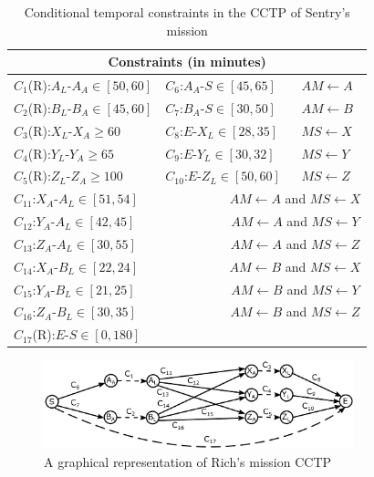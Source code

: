 \documentclass[jair,twoside,11pt,theapa]{article}
\begin{document}
\begin{table}[h!]	
	\centering
	\begin{tabular}{| m{5.0cm} m{4.0cm} m{5.0cm} m{4.0cm} m{2.0cm}|}
		\hline
		\multicolumn{5}{|c|}{\textbf{Constraints (in minutes)}} \\
		\hline		
		\multicolumn{2}{|l}{$C_1$(R):$A_L$-$A_A\in[50,60]$} &
		\multicolumn{2}{l}{$C_6$:$A_A$-$S\in[45,65]$} & $AM \leftarrow A$ \\ 
		\multicolumn{2}{|l}{$C_2$(R):$B_L$-$B_A\in[45,60]$} &
		\multicolumn{2}{l}{$C_7$:$B_A$-$S\in[30,50]$} & $AM \leftarrow B$ \\ 
		\multicolumn{2}{|l}{$C_3$(R):$X_L$-$X_A\geq60$} &
		\multicolumn{2}{l}{$C_8$:$E$-$X_L\in[28,35]$} & $MS \leftarrow X$ \\ 
		\multicolumn{2}{|l}{$C_4$(R):$Y_L$-$Y_A\geq65$} &
		\multicolumn{2}{l}{$C_9$:$E$-$Y_L\in[30,32]$} & $MS \leftarrow Y$ \\ 
		\multicolumn{2}{|l}{$C_5$(R):$Z_L$-$Z_A\geq100$} &
		\multicolumn{2}{l}{$C_{10}$:$E$-$Z_L\in[50,60]$} & $MS \leftarrow Z$ \\ 
		\hline
		\multicolumn{3}{|l}{$C_{11}$:$X_A$-$A_L\in[51,54]$} & \multicolumn{2}{c|}{$AM
			\leftarrow A$ and $MS \leftarrow X$} \\ 
		\multicolumn{3}{|l}{$C_{12}$:$Y_A$-$A_L\in[42,45]$} & \multicolumn{2}{c|}{$AM
			\leftarrow A$ and $MS \leftarrow Y$} \\ 
		\multicolumn{3}{|l}{$C_{13}$:$Z_A$-$A_L\in[30,55]$} & \multicolumn{2}{c|}{$AM
			\leftarrow A$ and $MS \leftarrow Z$} \\ 
		\multicolumn{3}{|l}{$C_{14}$:$X_A$-$B_L\in[22,24]$} & \multicolumn{2}{c|}{$AM
			\leftarrow B$ and $MS \leftarrow X$} \\ 
		\multicolumn{3}{|l}{$C_{15}$:$Y_A$-$B_L\in[21,25]$} & \multicolumn{2}{c|}{$AM
			\leftarrow B$ and $MS \leftarrow Y$} \\ 
		\multicolumn{3}{|l}{$C_{16}$:$Z_A$-$B_L\in[30,35]$} & \multicolumn{2}{c|}{$AM
			\leftarrow B$ and $MS \leftarrow Z$} \\ \hline
		
		\multicolumn{5}{|l|}{$C_{17}$(R):$E$-$S\in[0,180]$}
		\\
		\hline
	\end{tabular}
	\caption{Conditional temporal constraints in the CCTP of Sentry's mission}
	\label{table:constraints}
\end{table}

\begin{figure}[h!]
	\centering
	\includegraphics[width=0.80\textwidth]{figures/example_cctp.pdf}  
	\caption{A graphical representation of Rich's mission CCTP}
	\label{fig:example_cctp}
\end{figure}
\end{document}
